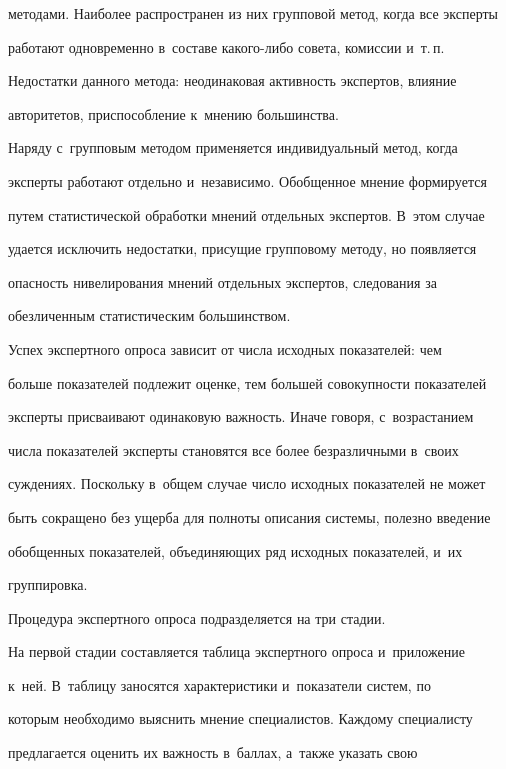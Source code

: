 методами. Наиболее распространен из них групповой метод, когда все эксперты 

работают одновременно в~составе ка\-ко\-го-ли\-бо совета, комиссии и~т.\,п. 

Недостатки данного метода: неодинаковая активность экспертов, влияние 

авторитетов, приспособление к~мнению большинства.

  

  Наряду с~групповым методом применяется индивидуальный метод, когда 

эксперты работают отдельно и~независимо. Обобщенное мнение формируется 

путем статистической обработки мнений отдельных экспертов. В~этом случае 

удается исключить недостатки, присущие групповому методу, но появляется 

опасность нивелирования мнений отдельных экспертов, следования за 

обезличенным статистическим большинством.

  

  Успех экспертного опроса зависит от числа исходных показателей: чем 

больше показателей подлежит оценке, тем большей совокупности показателей 

эксперты присваивают одинаковую важность. Иначе говоря, с~возрастанием 

числа показателей эксперты становятся все более безразличными в~своих 

суждениях. Поскольку в~общем случае число исходных показателей не может 

быть сокращено без ущерба для полноты описания системы, полезно введение 

обобщенных показателей, объединяющих ряд исходных показателей, и~их 

группировка. 

  

  Процедура экспертного опроса подразделяется на три стадии.

  

  На первой стадии составляется таблица экспертного опроса и~приложение 

к~ней. В~таб\-ли\-цу заносятся характеристики и~показатели систем, по 

которым необходимо выяснить мнение специалистов. Каждому специалисту 

предлагается оценить их важность в~баллах, а~также указать свою 

